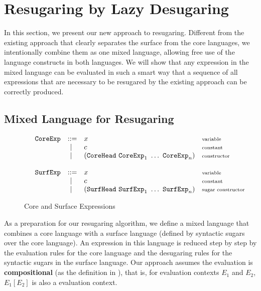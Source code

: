 
\section{Resugaring by Lazy Desugaring}
\label{sec3}

In this section, we present our new approach to resugaring. Different from the existing approach that clearly separates the surface from the core languages, we intentionally combine them as one mixed language, allowing free use of the language constructs in both languages. We will show that any expression in the mixed language can be evaluated in such a smart way that a sequence of all expressions that are necessary to be resugared by the existing approach can be correctly produced.

\subsection{Mixed Language for Resugaring}

\begin{figure}[t]
\begin{flushleft}
{\footnotesize
\[
\begin{array}{lllll}
 &\mbox{\tt CoreExp} &::=& x  & \mbox{{\scriptsize variable}}\\
       &&~|~& c  & \mbox{{\scriptsize constant}}\\
			 &&~|~& (\mbox{\tt CoreHead}~\mbox{\tt CoreExp}_1~\ldots~\mbox{\tt CoreExp}_n) & \mbox{{\scriptsize constructor}}\\
\\
 &\mbox{\tt SurfExp} &::=& x  & \mbox{{\scriptsize variable}}\\
       &&~|~& c  & \mbox{{\scriptsize constant}}\\
				 &&~|~& (\mbox{\tt SurfHead}~\mbox{\tt SurfExp}_1~\ldots~\mbox{\tt SurfExp}_n) & \mbox{{\scriptsize sugar constructor}}\\
\end{array}
\]
}
\end{flushleft}


	\caption{Core and Surface Expressions \todo{}}
	\label{fig:expression}
\end{figure}

As a preparation for our resugaring algorithm, we define a mixed language that combines a core language with a surface language (defined by syntactic sugars over the core language). An expression in this language is reduced step by step by the evaluation rules for the core language and the desugaring rules for the syntactic sugars in the surface language. Our approach assumes the evaluation is {\bfseries compositional} (as the definition in \cite{hygienic}), that is, for evaluation contexts $E_1$ and $E_2$, $E_1[E_2]$ is also a evaluation context.

